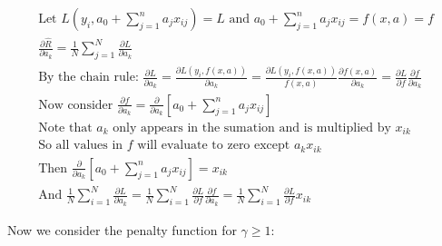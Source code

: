 \documentclass[11pt]{article}
\begin{document}
\begin{gather*}
\text{Let } L(y_{i}, a_{0} + \sum_{j = 1}^{n} a_{j}x_{ij}) = L 
\text{ and } a_{0} + \sum_{j = 1}^{n} a_{j}x_{ij} = f(x, a) = f\\
\frac{\partial \hat{R}}{\partial a_{k}} = 
\frac{1}{N} \sum_{j = 1}^{N} \frac{\partial L}{\partial a_{k}}\\
\text{By the chain rule: } 
\frac{\partial L}{\partial a_{k}} = 
\frac{\partial L(y_{i}, f(x, a))}{\partial a_{k}} = 
\frac{\partial L(y_{i}, f(x, a))}{f(x, a)} 
\frac{\partial f(x, a)}{\partial a_{k}} = 
\frac{\partial L}{\partial f} \frac{\partial f}{\partial a_{k}}\\
\text{Now consider } 
\frac{\partial f}{\partial a_{k}} = 
\frac{\partial}{\partial a_{k}} [a_{0} + \sum_{j = 1}^{n} a_{j}x_{ij}]\\
\text{Note that } a_{k} 
\text{ only appears in the sumation and is multiplied by } x_{ik}\\
\text{So all values in } f 
\text{ will evaluate to zero except } a_{k}x_{ik}\\
\text{Then } 
\frac{\partial}{\partial a_{k}} [a_{0} + \sum_{j = 1}^{n} a_{j}x_{ij}] = x_{ik}\\
\text{And } 
\frac{1}{N} \sum_{i = 1}^{N} \frac{\partial L}{\partial a_{k}} = 
\frac{1}{N} \sum_{i = 1}^{N} \frac{\partial L}{\partial f} 
\frac{\partial f}{\partial a_{k}} = 
\frac{1}{N} \sum_{i = 1}^{N} \frac{\partial L}{\partial f} x_{ik}
\end{gather*}

\vspace{5mm}
\noindent
Now we consider the penalty function for $\gamma \ge 1$:
\end{document}
